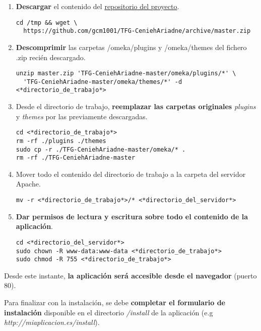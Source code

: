\begin{enumerate}
\begin{verbatim}
No es necesario modificar los parámetros `prefix` o `port`.
\end{verbatim}

\begin{verbatim}
[database]
host     = "localhost"
username = "usuario"
password = "contraseña"
dbname   = "omekadb"
prefix   = "omeka_"
charset  = "utf8"
;port     = ""
\end{verbatim}
\item
  \textbf{Descargar} el contenido del
  \href{https://github.com/gcm1001/TFG-CeniehAriadne}{repositorio del
  proyecto}.
\begin{verbatim}
cd /tmp && wget \
  https://github.com/gcm1001/TFG-CeniehAriadne/archive/master.zip
\end{verbatim}
\item
  \textbf{Descomprimir} las carpetas {/omeka/plugins} y {/omeka/themes}
  del fichero {.zip} recién descargado.
\begin{verbatim}
unzip master.zip 'TFG-CeniehAriadne-master/omeka/plugins/*' \
  'TFG-CeniehAriadne-master/omeka/themes/*' -d <*directorio_de_trabajo*>
\end{verbatim}
\item
  Desde el directorio de trabajo, \textbf{reemplazar las carpetas
  originales} \emph{plugins} y \emph{themes} por las previamente
  descargadas.
\begin{verbatim}
cd <*directorio_de_trabajo*>
rm -rf ./plugins ./themes
sudo cp -r ./TFG-CeniehAriadne-master/omeka/* .
rm -rf ./TFG-CeniehAriadne-master
\end{verbatim}
\item
  Mover todo el contenido del directorio de trabajo a la carpeta del
  servidor Apache.
\begin{verbatim}
mv -r <*directorio_de_trabajo*>/* <*directorio_del_servidor*>
\end{verbatim}
\item
  \textbf{Dar permisos de lectura y escritura sobre todo el contenido de
  la aplicación}.
\begin{verbatim}
cd <*directorio_del_servidor*>
sudo chown -R www-data:www-data <*directorio_de_trabajo*>
sudo chmod -R 755 <*directorio_de_trabajo*>
\end{verbatim}
\end{enumerate}

Desde este instante, \textbf{la aplicación será accesible desde el
navegador} (puerto 80).

Para finalizar con la instalación, se debe \textbf{completar el
formulario de instalación} disponible en el directorio \emph{/install} de la
aplicación (e.g \emph{http://miaplicacion.es/install}). 
 
